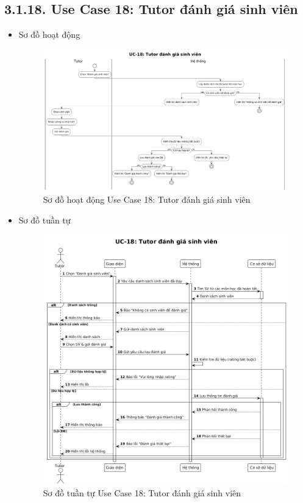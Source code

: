 \subsection*{3.1.18. Use Case 18: Tutor đánh giá sinh viên}
\begin{itemize}
    \item Sơ đồ hoạt động
    \begin{figure}[H]
    \centering
    \includegraphics[scale=0.35 ]{Picture/ACUC18.png}
    \caption{Sơ đồ hoạt động Use Case 18: Tutor đánh giá sinh viên}
    \end{figure}
    \item Sơ đồ tuần tự
    \begin{figure}[H]
    \centering
    \includegraphics[scale=0.35 ]{Picture/SEUC18.png}
    \caption{Sơ đồ tuần tự Use Case 18: Tutor đánh giá sinh viên}
    \end{figure}
\end{itemize}
